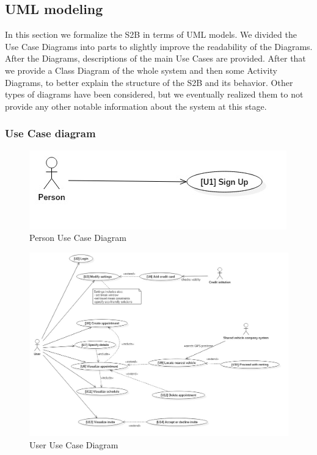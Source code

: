 \subsection{UML modeling}
	In this section we formalize the S2B in terms of UML models.\newline
	We divided the Use Case Diagrams into parts to slightly improve the readability of the Diagrams. After the Diagrams, descriptions of the main Use Cases are provided.\newline
	After that we provide a Class Diagram of the whole system and then some Activity Diagrams, to better explain the structure of the S2B and its behavior.\newline
	Other types of diagrams have been considered, but we eventually realized them to not provide any other notable information about the system at this stage.
	\subsubsection{Use Case diagram}
		\smallskip
		\begin{figure}[H]	
			\centerline{\includegraphics[scale= 0.7]{Images/UseCaseDiagram0}}
			\caption{Person Use Case Diagram}
		\end{figure}
		\begin{figure}[H]	
			\centerline{\includegraphics[width=\paperwidth-1]{Images/UseCaseDiagram1}}
			\caption{User Use Case Diagram}
		\end{figure}

